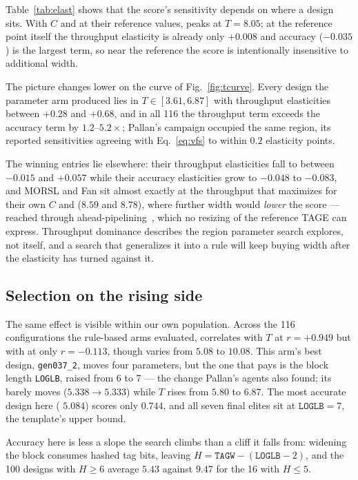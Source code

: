 \documentclass[conference]{IEEEtran}
\newcommand{\vfs}{\text{VFS}}
\newcommand{\mpki}{\text{MPKI}}
\newcommand{\epi}{\text{EPI}}
\begin{document}
Table~\ref{tab:elast} shows that the score's sensitivity depends on where a
design sits. With $C$ and \epi{} at their reference values, \vfs{} peaks at
$T=8.05$; at the reference point itself the throughput elasticity is already
only $+0.008$ and accuracy ($-0.035$) is the largest term, so near the reference
the score is intentionally insensitive to additional width.

The picture changes lower on the curve of Fig.~\ref{fig:tcurve}. Every design
the parameter arm produced lies in $T\in[3.61,6.87]$ with throughput
elasticities between $+0.28$ and $+0.68$, and in all 116 the throughput term
exceeds the accuracy term by $1.2$--$5.2\times$; Pallan's campaign occupied the
same region, its reported sensitivities agreeing with Eq.~\eqref{eq:vfs} to
within $0.2$ elasticity points.

The winning entries lie elsewhere: their throughput elasticities fall to between
$-0.015$ and $+0.057$ while their accuracy elasticities grow to
$-0.048$ to $-0.083$, and MORSL and Fan sit almost exactly at the throughput that
maximizes \vfs{} for their own $C$ and \epi{} ($8.59$ and $8.78$), where further
width would \emph{lower} the score --- reached through
ahead-pipelining~\cite{koizumi,fan,dang}, which no resizing of the reference
TAGE can express. Throughput dominance describes the region parameter search
explores, not \vfs{} itself, and a search that generalizes it into a rule will
keep buying width after the elasticity has turned against it.

\subsection{Selection on the rising side}

The same effect is visible within our own population. Across the 116
configurations the rule-based arms evaluated, \vfs{} correlates with $T$ at
$r=+0.949$ but with \mpki{} at only $r=-0.113$, though \mpki{} varies from
$5.08$ to $10.08$. This arm's best design, \texttt{gen037\_2}, moves four
parameters, but the one that pays is the block length \texttt{LOGLB}, raised
from 6 to 7 --- the change Pallan's agents also found; its \mpki{} barely moves
($5.338\to5.333$) while $T$ rises from $5.80$ to $6.87$. The most accurate design here (\mpki{} $5.084$) scores only
$0.744$, and all seven final elites sit at $\texttt{LOGLB}=7$, the template's
upper bound.

Accuracy here is less a slope the search climbs than a cliff it falls from:
widening the block consumes hashed tag bits, leaving
$H=\texttt{TAGW}-(\texttt{LOGLB}-2)$, and the 100 designs with $H\ge6$ average
$5.43$ \mpki{} against $9.47$ for the 16 with $H\le5$.
\end{document}
